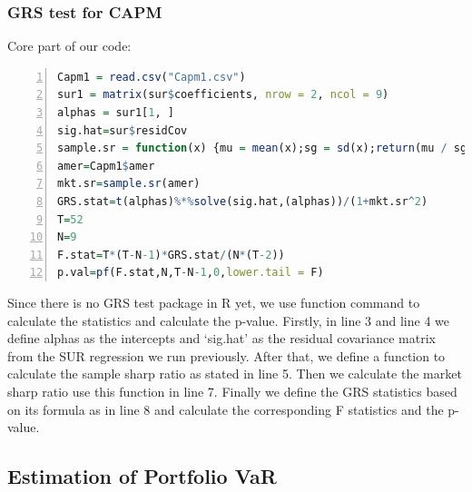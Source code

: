     \subsubsection{GRS test for CAPM}
    \noindent Core part of our code:\\
    \begin{lstlisting}[language=R,numbers=left, numberstyle=\normalsize]
Capm1 = read.csv("Capm1.csv")
sur1 = matrix(sur$coefficients, nrow = 2, ncol = 9)
alphas = sur1[1, ]
sig.hat=sur$residCov
sample.sr = function(x) {mu = mean(x);sg = sd(x);return(mu / sg)}
amer=Capm1$amer
mkt.sr=sample.sr(amer)
GRS.stat=t(alphas)%*%solve(sig.hat,(alphas))/(1+mkt.sr^2)
T=52
N=9
F.stat=T*(T-N-1)*GRS.stat/(N*(T-2))
p.val=pf(F.stat,N,T-N-1,0,lower.tail = F)
    \end{lstlisting}
    Since there is no GRS test package in R yet, we use function command to calculate the statistics and calculate the p-value. Firstly, in line 3 and line 4 we define alphas as the intercepts and `sig.hat' as the residual covariance matrix from the SUR regression we run previously. After that, we define a function to calculate the sample sharp ratio as stated in line 5. Then we calculate the market sharp ratio use this function in line 7. Finally we define the GRS statistics based on its formula as in line 8 and calculate the corresponding F statistics and the p-value.\\

    \subsection{Estimation of Portfolio VaR}
